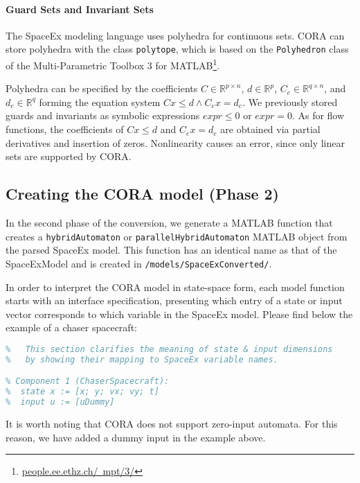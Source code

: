 \paragraph{Guard Sets and Invariant Sets}

The SpaceEx modeling language uses polyhedra for continuous sets. CORA can store polyhedra with the class \texttt{polytope}, which is based on the \texttt{Polyhedron} class of the Multi-Parametric Toolbox 3 for MATLAB\footnote{\href{http://people.ee.ethz.ch/~mpt/3/}{people.ee.ethz.ch/~mpt/3/}}.

Polyhedra can be specified by the coefficients $C\in\mathbb{R}^{p \times n}$, $d \in \mathbb{R}^{p}$, $C_e\in\mathbb{R}^{q \times n}$, and $d_e\in \mathbb{R}^{q}$ forming the equation system $C x \leq d \wedge C_e x = d_e$.
We previously stored guards and invariants as symbolic expressions $expr \leq 0$ or $expr = 0$. As for flow functions, the coefficients of $C x \leq d$ and $C_e x = d_e$ are obtained via partial derivatives and insertion of zeros. Nonlinearity causes an error, since only linear sets are supported by CORA.




\subsection{Creating the CORA model (Phase 2)} \label{sec:creatingCoraModel}

{\raggedright
In the second phase of the conversion, we generate a MATLAB function that creates a \texttt{hybridAutomaton} or \texttt{parallelHybridAutomaton} MATLAB object from the parsed SpaceEx model. This function has an identical name as that of the SpaceExModel and is created in \texttt{/models/SpaceExConverted/}. 
\par}

In order to interpret the CORA model in state-space form, each model function starts with an interface specification, presenting which entry of a state or input vector corresponds to which variable in the SpaceEx model. Please find below the example of a chaser spacecraft:
\begin{lstlisting}[language=matlab]
%% Interface Specification:
%   This section clarifies the meaning of state & input dimensions
%   by showing their mapping to SpaceEx variable names. 

% Component 1 (ChaserSpacecraft):
%  state x := [x; y; vx; vy; t]
%  input u := [uDummy]
\end{lstlisting}
It is worth noting that CORA does not support zero-input automata. For this reason, we have added a dummy input in the example above.

